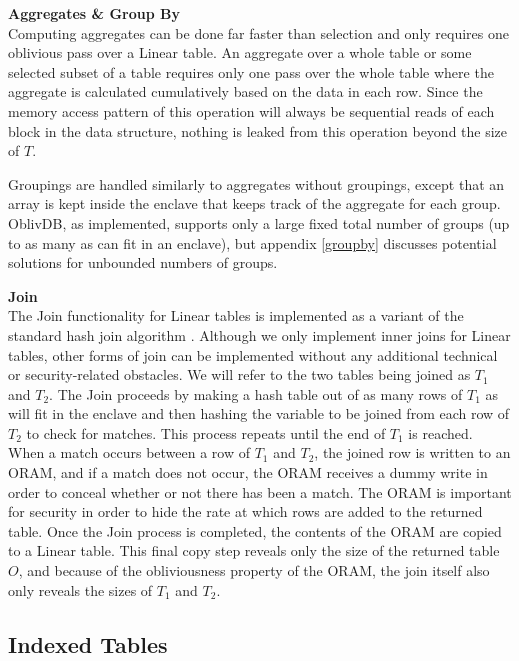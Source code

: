 \documentclass[USenglish,oneside,twocolumn]{article}
\def\name/{OblivDB}
\begin{document}
\medskip \noindent \textbf{Aggregates \& Group By}\\
Computing aggregates can be done far faster than selection and only requires one oblivious pass over a Linear table. An aggregate over a whole table or some selected subset of a table requires only one pass over the whole table where the aggregate is calculated cumulatively based on the data in each row. Since the memory access pattern of this operation will always be sequential reads of each block in the data structure, nothing is leaked from this operation beyond the size of $T$. 

Groupings are handled similarly to aggregates without groupings, except that an array is kept inside the enclave that keeps track of the aggregate for each group. \name/, as implemented, supports only a large fixed total number of groups (up to as many as can fit in an enclave), but appendix \ref{groupby} discusses potential solutions for unbounded numbers of groups. 

\medskip \noindent \textbf{Join}\\
The Join functionality for Linear tables is implemented as a variant of the standard hash join algorithm \cite{EN10}. Although we only implement inner joins for Linear tables, other forms of join can be implemented without any additional technical or security-related obstacles. We will refer to the two tables being joined as $T_1$ and $T_2$. The Join proceeds by making a hash table out of as many rows of $T_1$ as will fit in the enclave and then hashing the variable to be joined from each row of $T_2$ to check for matches. This process repeats until the end of $T_1$ is reached. When a match occurs between a row of $T_1$ and $T_2$, the joined row is written to an ORAM, and if a match does not occur, the ORAM receives a dummy write in order to conceal whether or not there has been a match. The ORAM is important for security in order to hide the rate at which rows are added to the returned table. Once the Join process is completed, the contents of the ORAM are copied to a Linear table. This final copy step reveals only the size of the returned table $O$, and because of the obliviousness property of the ORAM, the join itself also only reveals the sizes of $T_1$ and $T_2$. 

\subsection{Indexed Tables}
\end{document}
